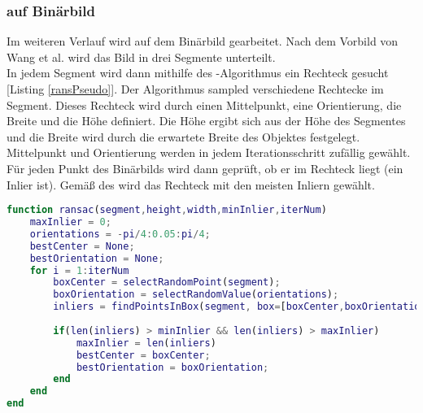 \subsubsection{\rans auf Binärbild}
Im weiteren Verlauf wird auf dem  Binärbild gearbeitet. Nach dem Vorbild von Wang et al. \cite{wang2004lane} wird das Bild in drei Segmente unterteilt.\\
In jedem Segment wird dann mithilfe des \rans -Algorithmus ein Rechteck gesucht [Listing \ref{ransPseudo}]. Der Algorithmus sampled verschiedene Rechtecke im Segment. Dieses Rechteck wird durch einen Mittelpunkt, eine Orientierung, die Breite und die Höhe definiert. Die Höhe ergibt sich aus der Höhe des Segmentes und die Breite wird durch die erwartete Breite des Objektes festgelegt. Mittelpunkt und Orientierung werden in jedem Iterationsschritt zufällig gewählt.\\
Für jeden Punkt des Binärbilds wird dann geprüft, ob er im Rechteck liegt (ein Inlier ist). Gemäß des \rans wird das Rechteck mit den meisten Inliern gewählt.\\
\begin{lstlisting}[language=Matlab,caption={Eingesetzter \rans als Pseudocode.},label=ransPseudo]
function ransac(segment,height,width,minInlier,iterNum)
	maxInlier = 0;
	orientations = -pi/4:0.05:pi/4;
	bestCenter = None;
	bestOrientation = None;
	for i = 1:iterNum
		boxCenter = selectRandomPoint(segment);
		boxOrientation = selectRandomValue(orientations);
		inliers = findPointsInBox(segment, box=[boxCenter,boxOrientation,height,width]);
		
		if(len(inliers) > minInlier && len(inliers) > maxInlier)
			maxInlier = len(inliers)
			bestCenter = boxCenter;
			bestOrientation = boxOrientation;
		end
	end
end
\end{lstlisting}

